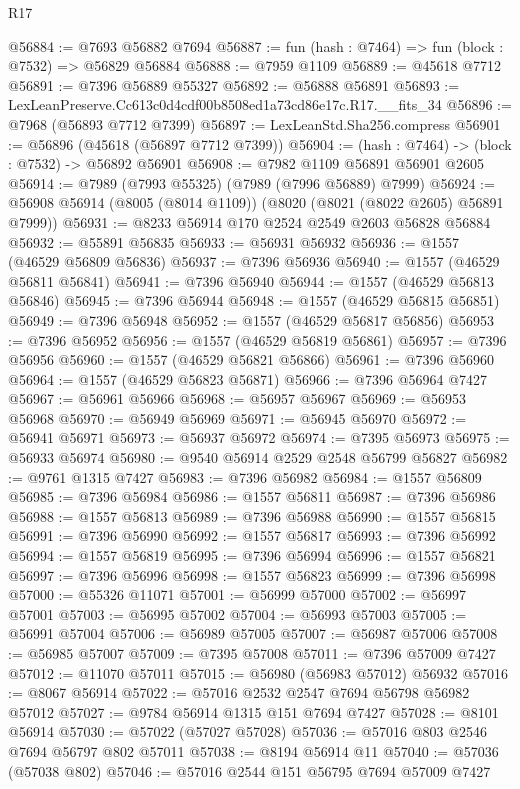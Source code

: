 \begin{lexlean}{R17}
\begin{coremodule}
@56884 := @7693 @56882 @7694
@56887 := fun (hash : @7464) => fun (block : @7532) => @56829 @56884
@56888 := @7959 @1109
@56889 := @45618 @7712
@56891 := @7396 @56889 @55327
@56892 := @56888 @56891
@56893 := LexLeanPreserve.Cc613c0d4cdf00b8508ed1a73cd86e17c.R17.__fits_34
@56896 := @7968 (@56893 @7712 @7399)
@56897 := LexLeanStd.Sha256.compress
@56901 := @56896 (@45618 (@56897 @7712 @7399))
@56904 := (hash : @7464) -> (block : @7532) -> @56892 @56901
@56908 := @7982 @1109 @56891 @56901 @2605
@56914 := @7989 (@7993 @55325) (@7989 (@7996 @56889) @7999)
@56924 := @56908 @56914 (@8005 (@8014 @1109)) (@8020 (@8021 (@8022 @2605) @56891 @7999))
@56931 := @8233 @56914 @170 @2524 @2549 @2603 @56828 @56884
@56932 := @55891 @56835
@56933 := @56931 @56932
@56936 := @1557 (@46529 @56809 @56836)
@56937 := @7396 @56936
@56940 := @1557 (@46529 @56811 @56841)
@56941 := @7396 @56940
@56944 := @1557 (@46529 @56813 @56846)
@56945 := @7396 @56944
@56948 := @1557 (@46529 @56815 @56851)
@56949 := @7396 @56948
@56952 := @1557 (@46529 @56817 @56856)
@56953 := @7396 @56952
@56956 := @1557 (@46529 @56819 @56861)
@56957 := @7396 @56956
@56960 := @1557 (@46529 @56821 @56866)
@56961 := @7396 @56960
@56964 := @1557 (@46529 @56823 @56871)
@56966 := @7396 @56964 @7427
@56967 := @56961 @56966
@56968 := @56957 @56967
@56969 := @56953 @56968
@56970 := @56949 @56969
@56971 := @56945 @56970
@56972 := @56941 @56971
@56973 := @56937 @56972
@56974 := @7395 @56973
@56975 := @56933 @56974
@56980 := @9540 @56914 @2529 @2548 @56799 @56827
@56982 := @9761 @1315 @7427
@56983 := @7396 @56982
@56984 := @1557 @56809
@56985 := @7396 @56984
@56986 := @1557 @56811
@56987 := @7396 @56986
@56988 := @1557 @56813
@56989 := @7396 @56988
@56990 := @1557 @56815
@56991 := @7396 @56990
@56992 := @1557 @56817
@56993 := @7396 @56992
@56994 := @1557 @56819
@56995 := @7396 @56994
@56996 := @1557 @56821
@56997 := @7396 @56996
@56998 := @1557 @56823
@56999 := @7396 @56998
@57000 := @55326 @11071
@57001 := @56999 @57000
@57002 := @56997 @57001
@57003 := @56995 @57002
@57004 := @56993 @57003
@57005 := @56991 @57004
@57006 := @56989 @57005
@57007 := @56987 @57006
@57008 := @56985 @57007
@57009 := @7395 @57008
@57011 := @7396 @57009 @7427
@57012 := @11070 @57011
@57015 := @56980 (@56983 @57012) @56932
@57016 := @8067 @56914
@57022 := @57016 @2532 @2547 @7694 @56798 @56982 @57012
@57027 := @9784 @56914 @1315 @151 @7694 @7427
@57028 := @8101 @56914
@57030 := @57022 (@57027 @57028)
@57036 := @57016 @803 @2546 @7694 @56797 @802 @57011
@57038 := @8194 @56914 @11
@57040 := @57036 (@57038 @802)
@57046 := @57016 @2544 @151 @56795 @7694 @57009 @7427

\end{coremodule}
\end{lexlean}
